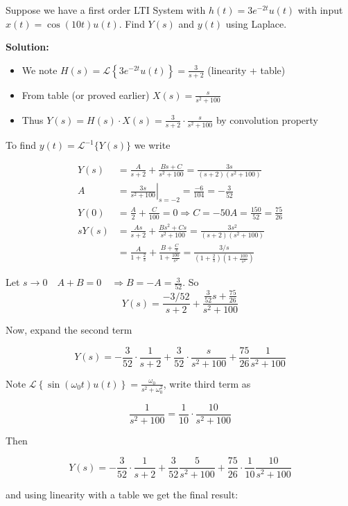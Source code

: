 \documentclass{article}
\begin{document}
Suppose we have a first order LTI System with $h(t)=3 e^{-2 t} u(t)$ with input $x(t)=\cos (10 t) u(t)$. Find $Y(s)$ and $y(t)$ using Laplace.

\textbf{Solution:}

\begin{itemize}
  \item We note $H(s)=\mathcal{L}\left\{3 e^{-2 t} u(t)\right\}=\frac{3}{s+2}$ (linearity + table)
  \item From table (or proved earlier) $X(s)=\frac{s}{s^{2}+100}$
\item Thus $Y(s)=H(s) \cdot X(s)=\frac{3}{s+2} \cdot \frac{s}{s^{2}+100}$ by convolution property
\end{itemize}

To find $y(t)=\mathcal{L}^{-1}\{Y(s)\}$ we write

\begin{align*}
Y(s) & =\frac{A}{s+2}+\frac{B s+C}{s^{2}+100}=\frac{3 s}{(s+2)\left(s^{2}+100\right)} \\
A & =\left.\frac{3 s}{s^{2}+100}\right|_{s=-2}=\frac{-6}{104}=-\frac{3}{52} \\
Y(0) & =\frac{A}{2}+\frac{C}{100}=0 \Rightarrow C=-50 A=\frac{150}{52}=\frac{75}{26} \\
s Y(s) & =\frac{A s}{s+2}+\frac{B s^{2}+C s}{s^{2}+100}=\frac{3 s^{2}}{(s+2)\left(s^{2}+100\right)} \\
&= \frac{A}{1+\frac{2}{s}}+\frac{B+\frac{C}{s}}{1+\frac{100}{s^{2}}}=\frac{3 / s}{(1+\frac{2}{s})\left(1+\frac{100}{s^{2}}\right)}
\end{align*}

Let $s\rightarrow 0 \quad A+B=0 \quad \Rightarrow B=-A=\frac{3}{52}$. So
\[
Y(s)=\frac{-3 / 52}{s+2}+\frac{\frac{3}{52} s+\frac{75}{26}}{s^{2}+100}
\]

Now, expand the second term

$$
Y(s)=-\frac{3}{52} \cdot \frac{1}{s+2}+\frac{3}{52} \cdot \frac{s}{s^{2}+100}+\frac{75}{26} \frac{1}{s^{2}+100}
$$

Note $\mathcal{L}\left\{\sin \left(\omega_0 t\right) u(t)\right\}=\frac{\omega_{0}}{s^{2}+\omega_{0}^{2}}$, write third term as

$$
\frac{1}{s^{2}+100}=\frac{1}{10} \cdot \frac{10}{s^{2}+100}
$$

Then

$$
Y(s)=-\frac{3}{52} \cdot \frac{1}{s+2}+\frac{3}{52} \frac{5}{s^{2}+100}+\frac{75}{26} \cdot \frac{1}{10} \frac{10}{s^{2}+100}
$$

and using linearity with a table we get the final result:
\end{document}
